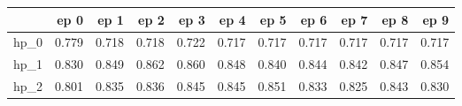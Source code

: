 \begin{tabular}{lrrrrrrrrrr}
\toprule
{} &   ep 0 &   ep 1 &   ep 2 &   ep 3 &   ep 4 &   ep 5 &   ep 6 &   ep 7 &   ep 8 &   ep 9 \\
\midrule
hp\_0 &  0.779 &  0.718 &  0.718 &  0.722 &  0.717 &  0.717 &  0.717 &  0.717 &  0.717 &  0.717 \\
hp\_1 &  0.830 &  0.849 &  0.862 &  0.860 &  0.848 &  0.840 &  0.844 &  0.842 &  0.847 &  0.854 \\
hp\_2 &  0.801 &  0.835 &  0.836 &  0.845 &  0.845 &  0.851 &  0.833 &  0.825 &  0.843 &  0.830 \\
\bottomrule
\end{tabular}
